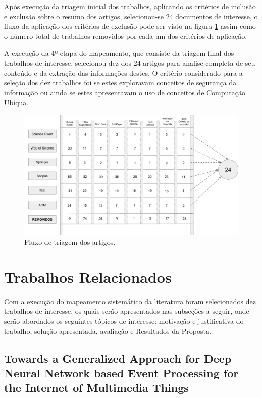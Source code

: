 \documentclass[tid,table]{texufpel} %
\begin{document}
Após execução da triagem inicial dos trabalhos, aplicando os critérios de inclusão e exclusão sobre o resumo dos artigos, selecionou-se 24 documentos de interesse, o fluxo da aplicação dos critérios de exclusão pode ser visto na figura \ref{fig:grafFluxoTriagemInicial} assim como o número total de trabalhos removidos por cada um dos critérios de aplicação. 

A execução da 4º etapa do mapeamento, que consiste da triagem final dos trabalhos de interesse, selecionou dez dos 24 artigos para analise completa de seu conteúdo e da extração das informações destes. O critério considerado para a seleção dos dez trabalhos foi se estes exploravam conceitos de segurança da informação ou ainda se estes apresentavam o uso de conceitos de Computação Ubíqua. 


\begin{landscape}
\begin{figure}[ht]
	\centering
	\includegraphics[width=1.7\textwidth]{imagens/FluxoTriagemInicial.png}
	\caption{Fluxo de triagem dos artigos.}
	\label{fig:grafFluxoTriagemInicial}
\end{figure}
\end{landscape}


\section{Trabalhos Relacionados}
Com a execução do mapeamento sistemático da literatura
foram selecionados dez trabalhos de interesse, os quais serão apresentados nas subseções a seguir, onde serão abordados os seguintes tópicos de interesse: motivação e justificativa do trabalho, solução apresentada, avaliação e Resultados da Proposta.


\subsection{Towards a Generalized Approach for Deep Neural Network based Event Processing for the Internet of Multimedia Things}
\end{document}
